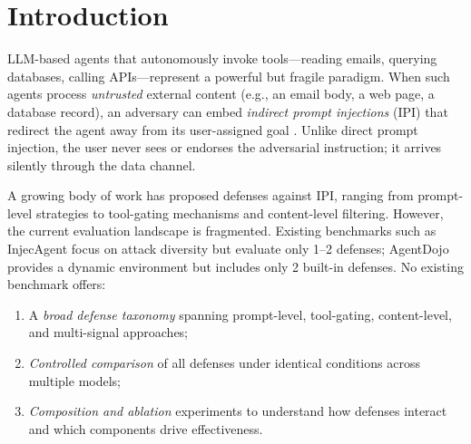 \section{Introduction}
\label{sec:intro}

LLM-based agents that autonomously invoke tools---reading emails, querying databases, calling APIs---represent a powerful but fragile paradigm.
When such agents process \emph{untrusted} external content (e.g., an email body, a web page, a database record), an adversary can embed \emph{indirect prompt injections} (IPI) that redirect the agent away from its user-assigned goal \citep{greshake2023youve,zhan2024injecagent}.
Unlike direct prompt injection, the user never sees or endorses the adversarial instruction; it arrives silently through the data channel.

A growing body of work has proposed defenses against IPI, ranging from prompt-level strategies \citep{hines2024defending,yi2023benchmarking} to tool-gating mechanisms \citep{xiang2024melon} and content-level filtering.
However, the current evaluation landscape is fragmented.
Existing benchmarks such as InjecAgent \citep{zhan2024injecagent} focus on attack diversity but evaluate only 1--2 defenses; AgentDojo \citep{debenedetti2024agentdojo} provides a dynamic environment but includes only 2 built-in defenses.
No existing benchmark offers:
\begin{enumerate}
    \item A \emph{broad defense taxonomy} spanning prompt-level, tool-gating, content-level, and multi-signal approaches;
    \item \emph{Controlled comparison} of all defenses under identical conditions across multiple models;
    \item \emph{Composition and ablation} experiments to understand how defenses interact and which components drive effectiveness.
\end{enumerate}

